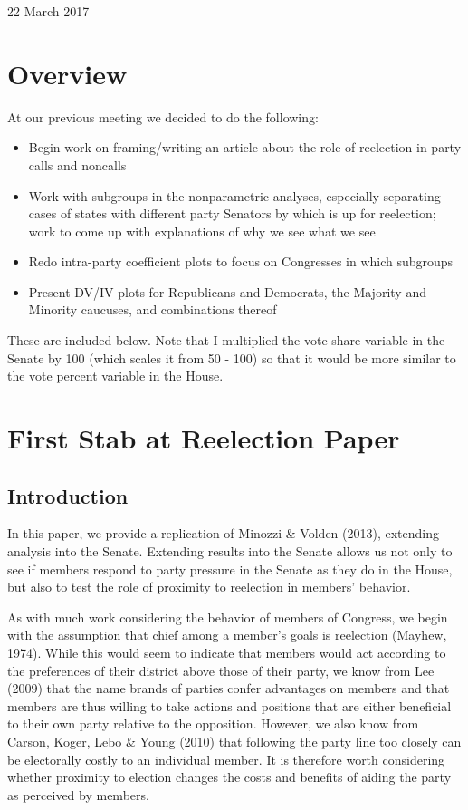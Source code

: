\documentclass[12pt]{article}
\begin{document}
	
\begin{center}
	\Large 22 March 2017
\end{center}

\section{Overview}

At our previous meeting we decided to do the following:

\begin{itemize}
	\item Begin work on framing/writing an article about the role of reelection in party calls and noncalls
	
	\item Work with subgroups in the nonparametric analyses, especially separating cases of states with different party Senators by which is up for reelection; work to come up with explanations of why we see what we see
	
	\item Redo intra-party coefficient plots to focus on Congresses in which subgroups 
	
	\item Present DV/IV plots for Republicans and Democrats, the Majority and Minority caucuses, and combinations thereof
\end{itemize}

\noindent
These are included below. Note that I multiplied the vote share variable in the Senate by 100 (which scales it from 50 - 100) so that it would be more similar to the vote percent variable in the House.

\section{First Stab at Reelection Paper}

\subsection{Introduction}

In this paper, we provide a replication of Minozzi \& Volden (2013), extending analysis into the Senate. Extending results into the Senate allows us not only to see if members respond to party pressure in the Senate as they do in the House, but also to test the role of proximity to reelection in members' behavior.

As with much work considering the behavior of members of Congress, we begin with the assumption that chief among a member's goals is reelection (Mayhew, 1974). While this would seem to indicate that members would act according to the preferences of their district above those of their party, we know from Lee (2009) that the name brands of parties confer advantages on members and that members are thus willing to take actions and positions that are either beneficial to their own party relative to the opposition. However, we also know from Carson, Koger, Lebo \& Young (2010) that following the party line too closely can be electorally costly to an individual member. It is therefore worth considering whether proximity to election changes the costs and benefits of aiding the party as perceived by members.
\end{document}
